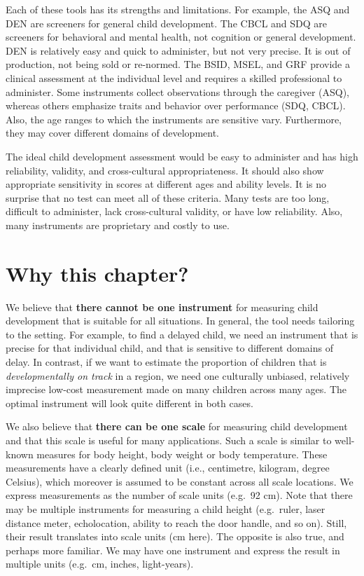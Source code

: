 \documentclass[
]{book}
\begin{document}
Each of these tools has its strengths and limitations. For example, the ASQ and DEN are screeners for general child development. The CBCL and SDQ are screeners for behavioral and mental health, not cognition or general development. DEN is relatively easy and quick to administer, but not very precise. It is out of production, not being sold or re-normed. The BSID, MSEL, and GRF provide a clinical assessment at the individual level and requires a skilled professional to administer. Some instruments collect observations through the caregiver (ASQ), whereas others emphasize traits and behavior over performance (SDQ, CBCL). Also, the age ranges to which the instruments are sensitive vary. Furthermore, they may cover different domains of development.

The ideal child development assessment would be easy to administer and has high reliability, validity, and cross-cultural appropriateness. It should also show appropriate sensitivity in scores at different ages and ability levels. It is no surprise that no test can meet all of these criteria. Many tests are too long, difficult to administer, lack cross-cultural validity, or have low reliability. Also, many instruments are proprietary and costly to use.

\hypertarget{sec:why}{%
\section{Why this chapter?}\label{sec:why}}

We believe that \textbf{there cannot be one instrument} for measuring child development that is suitable for all situations. In general, the tool needs tailoring to the setting. For example, to find a delayed child, we need an instrument that is precise for that individual child, and that is sensitive to different domains of delay. In contrast, if we want to estimate the proportion of children that is \emph{developmentally on track} in a region, we need one culturally unbiased, relatively imprecise low-cost measurement made on many children across many ages. The optimal instrument will look quite different in both cases.

We also believe that \textbf{there can be one scale} for measuring child development and that this scale is useful for many applications. Such a scale is similar to well-known measures for body height, body weight or body temperature. These measurements have a clearly defined unit (i.e., centimetre, kilogram, degree Celsius), which moreover is assumed to be constant across all scale locations. We express measurements as the number of scale units (e.g.~92 cm). Note that there may be multiple instruments for measuring a child height (e.g.~ruler, laser distance meter, echolocation, ability to reach the door handle, and so on). Still, their result translates into scale units (cm here). The opposite is also true, and perhaps more familiar. We may have one instrument and express the result in multiple units (e.g.~cm, inches, light-years).
\end{document}
